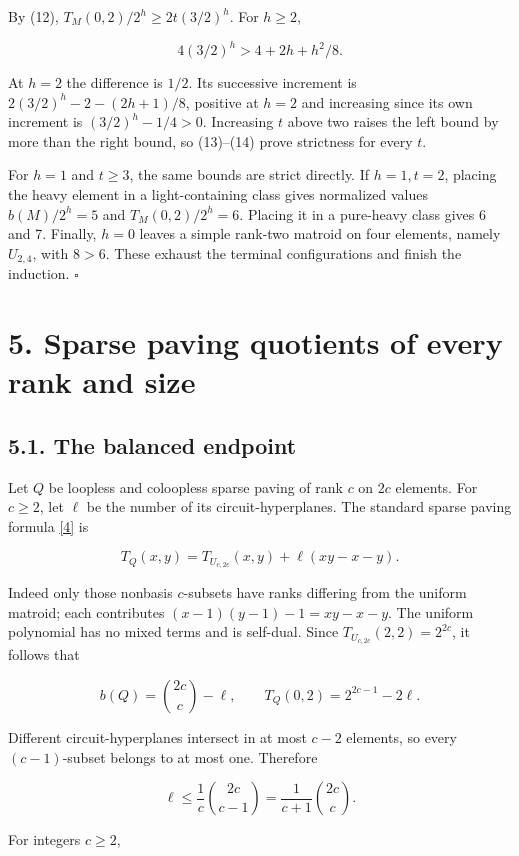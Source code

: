 \documentclass[11pt]{article}
\begin{document}
By (12), \(T_M(0,2)/2^h\ge2t(3/2)^h\). For \(h\ge2\),

\[
4(3/2)^h>4+2h+h^2/8. \tag{14}
\]

At \(h=2\) the difference is \(1/2\). Its successive increment is \(2(3/2)^h-2-(2h+1)/8\), positive at \(h=2\) and increasing since its own increment is \((3/2)^h-1/4>0\). Increasing \(t\) above two raises the left bound by more than the right bound, so (13)--(14) prove strictness for every \(t\).

For \(h=1\) and \(t\ge3\), the same bounds are strict directly. If \(h=1,t=2\), placing the heavy element in a light-containing class gives normalized values \(b(M)/2^h=5\) and \(T_M(0,2)/2^h=6\). Placing it in a pure-heavy class gives 6 and 7. Finally, \(h=0\) leaves a simple rank-two matroid on four elements, namely \(U_{2,4}\), with \(8>6\). These exhaust the terminal configurations and finish the induction. \hfill\(\square\)

\section*{5. Sparse paving quotients of every rank and size}

\subsection*{5.1. The balanced endpoint}

Let \(Q\) be loopless and coloopless sparse paving of rank \(c\) on \(2c\) elements. For \(c\ge2\), let \(\ell\) be the number of its circuit-hyperplanes. The standard sparse paving formula \hyperlink{ref4}{[4]} is

\[
T_Q(x,y)=T_{U_{c,2c}}(x,y)+\ell(xy-x-y). \tag{15}
\]

Indeed only those nonbasis \(c\)-subsets have ranks differing from the uniform matroid; each contributes \((x-1)(y-1)-1=xy-x-y\). The uniform polynomial has no mixed terms and is self-dual. Since \(T_{U_{c,2c}}(2,2)=2^{2c}\), it follows that

\[
b(Q)=\binom{2c}{c}-\ell,
\qquad T_Q(0,2)=2^{2c-1}-2\ell. \tag{16}
\]

Different circuit-hyperplanes intersect in at most \(c-2\) elements, so every \((c-1)\)-subset belongs to at most one. Therefore

\[
\ell\le\frac1c\binom{2c}{c-1}=\frac{1}{c+1}\binom{2c}{c}.
\]

For integers \(c\ge2\),
\end{document}
